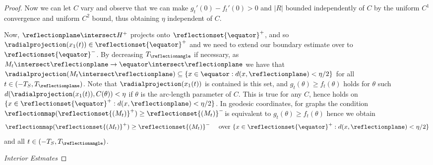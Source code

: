 \documentclass[12pt]{amsart}
\begin{document}
\begin{proof}
Now we can let \(C\) vary and observe that we can make \(g_t'(0) - f_t'(0) > 0\) and \(|R|\) bounded independently of \(C\) by the uniform \(C^1\) convergence and uniform \(C^2\) bound, thus obtaining \(\eta\) independent of \(C\). 

Now, \(\reflectionplane \intersect H^+\) projects onto \(\reflectionset{\equator}^+\), and so \(\radialprojection(x_1(t)) \in \reflectionset{\equator}^+\) and we need to extend our boundary estimate over to \(\reflectionset{\equator}^-\). By decreasing \(T_{\reflectionangle}\) if necessary, as \(M_t\intersect\reflectionplane \to \equator\intersect\reflectionplane\) we have that \(\radialprojection(M_t\intersect\reflectionplane) \subseteq \{x \in \equator : d(x, \reflectionplane) < \eta/2\}\) for all \(t \in (-T_S, T_{\reflectionplane})\). Note that \(\radialprojection(x_1(t))\) is contained is this set, and \(g_t(\theta) \geq f_t (\theta)\) holds for \(\theta\) such \(d(\radialprojection(x_1(t)), C(\theta)) < \eta\) if \(\theta\) is the arc-length parameter of \(C\). This is true for any \(C\), hence holds on \(\{x \in \reflectionset{\equator}^+ : d(x, \reflectionplane) < \eta/2\}\). In geodesic coordinates, for graphs the condition \(\reflectionmap(\reflectionset{(M_t)}^+) \geq \reflectionset{(M_t)}^-\)is equivalent to \(g_t(\theta) \geq f_t (\theta)\) hence we obtain
\begin{equation}
\label{eq:boundaryestimate}
\reflectionmap(\reflectionset{(M_t)}^+) \geq \reflectionset{(M_t)}^- \quad \text{ over } \{x \in \reflectionset{\equator}^+: d(x, \reflectionplane) < \eta/2\}
\end{equation}
and all \(t \in (-T_S, T_{\reflectionangle})\).

\emph{Interior Estmates}


\end{proof}
\end{document}

